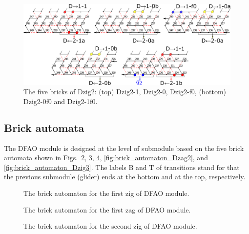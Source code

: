\documentclass[runningheads]{llncs}
\begin{document}
\begin{figure}[h]
\centering
\includegraphics[width=\linewidth]{Figs/DFAO-zig2.png}
\caption{The five bricks of Dzig2: (top) Dzig2-1, Dzig2-0, Dzig2-f0, (bottom) Dzig2-0f0 and Dzig2-1f0. }
\label{fig:Dzig2}
\end{figure}

	\subsection{Brick automata}
	\label{ap_subsect:DFAO_module_BA}

The DFAO module is designed at the level of submodule based on the five brick automata shown in Figs.~\ref{fig:brick_automaton_Dzig1}, \ref{fig:brick_automaton_Dzag1}, \ref{fig:brick_automaton_Dzig2}, \ref{fig:brick_automaton_Dzag2}, and \ref{fig:brick_automaton_Dzig3}. 
The labels B and T of transitions stand for that the previous submodule (glider) ends at the bottom and at the top, respectively. 

\begin{figure}[ht]
\centering
\caption{The brick automaton for the first zig of DFAO module.}
\label{fig:brick_automaton_Dzig1}
\end{figure}

\begin{figure}[ht]
\centering
\caption{The brick automaton for the first zag of DFAO module.}
\label{fig:brick_automaton_Dzag1}
\end{figure}

\begin{figure}[ht]
\centering
\caption{The brick automaton for the second zig of DFAO module.}
\label{fig:brick_automaton_Dzig2}
\end{figure}
\end{document}
